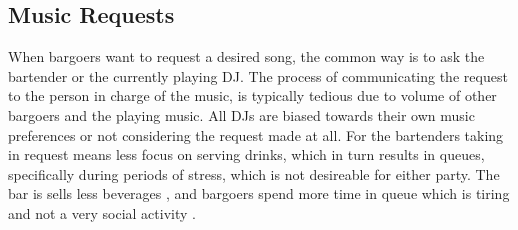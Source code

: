 \subsection{Music Requests}

When bargoers want to request a desired song, the common way is to ask the bartender or the currently playing DJ. The process of communicating the request to the person in charge of the music, is typically tedious due to volume of other bargoers and the playing music. All DJs are biased towards their own music preferences or not considering the request made at all. For the bartenders taking in request means less focus on serving drinks, which in turn results in queues, specifically during periods of stress, which is not desireable for either party. The bar is sells less beverages \cite{Queues gives lower income}, and bargoers spend more time in queue which is tiring and not a very social activity \cite{Queues er træls}.
